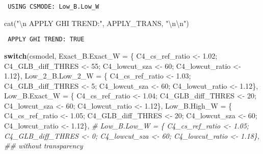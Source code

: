 \documentclass[
  10pt,
  a4paper,oneside]{article}
\newenvironment{Shaded}{\begin{snugshade}}{\end{snugshade}}
\newcommand{\AttributeTok}[1]{\textcolor[rgb]{0.77,0.63,0.00}{#1}}
\newcommand{\CommentTok}[1]{\textcolor[rgb]{0.56,0.35,0.01}{\textit{#1}}}
\newcommand{\ControlFlowTok}[1]{\textcolor[rgb]{0.13,0.29,0.53}{\textbf{#1}}}
\newcommand{\DecValTok}[1]{\textcolor[rgb]{0.00,0.00,0.81}{#1}}
\newcommand{\FloatTok}[1]{\textcolor[rgb]{0.00,0.00,0.81}{#1}}
\newcommand{\FunctionTok}[1]{\textcolor[rgb]{0.00,0.00,0.00}{#1}}
\newcommand{\NormalTok}[1]{#1}
\newcommand{\OtherTok}[1]{\textcolor[rgb]{0.56,0.35,0.01}{#1}}
\newcommand{\SpecialCharTok}[1]{\textcolor[rgb]{0.00,0.00,0.00}{#1}}
\newcommand{\StringTok}[1]{\textcolor[rgb]{0.31,0.60,0.02}{#1}}
\begin{document}
\begin{verbatim}
 USING CSMODE: Low_B.Low_W 
\end{verbatim}

\begin{Shaded}
\begin{Highlighting}[]
\FunctionTok{cat}\NormalTok{(}\StringTok{"}\SpecialCharTok{\textbackslash{}n}\StringTok{ APPLY GHI TREND:"}\NormalTok{, APPLY\_TRANS, }\StringTok{"}\SpecialCharTok{\textbackslash{}n\textbackslash{}n}\StringTok{"}\NormalTok{)}
\end{Highlighting}
\end{Shaded}

\begin{verbatim}
 APPLY GHI TREND: TRUE 
\end{verbatim}

\begin{Shaded}
\begin{Highlighting}[]
\ControlFlowTok{switch}\NormalTok{(csmodel,}
       \AttributeTok{Exact\_B.Exact\_W =}\NormalTok{ \{ C4\_cs\_ref\_ratio }\OtherTok{\textless{}{-}} \FloatTok{1.02}\NormalTok{; C4\_GLB\_diff\_THRES }\OtherTok{\textless{}{-}} \DecValTok{55}\NormalTok{; C4\_lowcut\_sza }\OtherTok{\textless{}{-}} \DecValTok{60}\NormalTok{; C4\_lowcut\_ratio }\OtherTok{\textless{}{-}} \FloatTok{1.12}\NormalTok{\},}
       \AttributeTok{Low\_2\_B.Low\_2\_W =}\NormalTok{ \{ C4\_cs\_ref\_ratio }\OtherTok{\textless{}{-}} \FloatTok{1.03}\NormalTok{; C4\_GLB\_diff\_THRES }\OtherTok{\textless{}{-}}  \DecValTok{5}\NormalTok{; C4\_lowcut\_sza }\OtherTok{\textless{}{-}} \DecValTok{60}\NormalTok{; C4\_lowcut\_ratio }\OtherTok{\textless{}{-}} \FloatTok{1.12}\NormalTok{\},}
       \AttributeTok{Low\_B.Exact\_W   =}\NormalTok{ \{ C4\_cs\_ref\_ratio }\OtherTok{\textless{}{-}} \FloatTok{1.04}\NormalTok{; C4\_GLB\_diff\_THRES }\OtherTok{\textless{}{-}} \DecValTok{20}\NormalTok{; C4\_lowcut\_sza }\OtherTok{\textless{}{-}} \DecValTok{60}\NormalTok{; C4\_lowcut\_ratio }\OtherTok{\textless{}{-}} \FloatTok{1.12}\NormalTok{\},}
       \AttributeTok{Low\_B.High\_W    =}\NormalTok{ \{ C4\_cs\_ref\_ratio }\OtherTok{\textless{}{-}} \FloatTok{1.05}\NormalTok{; C4\_GLB\_diff\_THRES }\OtherTok{\textless{}{-}} \DecValTok{20}\NormalTok{; C4\_lowcut\_sza }\OtherTok{\textless{}{-}} \DecValTok{60}\NormalTok{; C4\_lowcut\_ratio }\OtherTok{\textless{}{-}} \FloatTok{1.12}\NormalTok{\},}
       \CommentTok{\# Low\_B.Low\_W     = \{ C4\_cs\_ref\_ratio \textless{}{-} 1.05; C4\_GLB\_diff\_THRES \textless{}{-}  0; C4\_lowcut\_sza \textless{}{-} 60; C4\_lowcut\_ratio \textless{}{-} 1.18\}, \#\# without transparency}

\end{Highlighting}
\end{Shaded}
\end{document}
